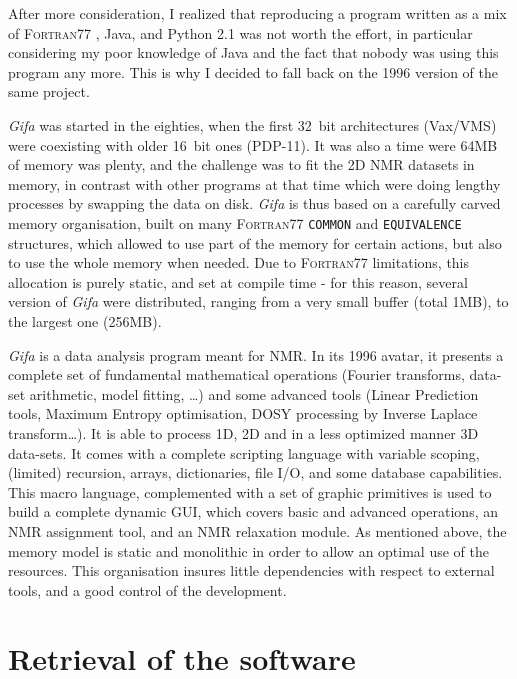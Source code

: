 After more consideration, I realized that reproducing a program written
as a mix of F\textsc{ortran}77 , Java, and Python 2.1 was not worth the
effort, in particular considering my poor knowledge of Java and the fact
that nobody was using this program any more. This is why I decided to
fall back on the 1996 version of the same project.

\emph{Gifa} was started in the eighties, when the first 32~bit
architectures (Vax/VMS) were coexisting with older 16~bit ones (PDP-11). It
was also a time were 64MB of memory was plenty, and the challenge was to
fit the 2D NMR datasets in memory, in contrast with other programs at
that time which were doing lengthy processes by swapping the data on
disk. \emph{Gifa} is thus based on a carefully carved memory
organisation, built on many F\textsc{ortran}77 \texttt{COMMON} and
\texttt{EQUIVALENCE} structures, which allowed to use part of the memory
for certain actions, but also to use the whole memory when needed. Due
to F\textsc{ortran}77 limitations, this allocation is purely static, and
set at compile time - for this reason, several version of \emph{Gifa}
were distributed, ranging from a very small buffer (total 1MB), to the
largest one (256MB).

\emph{Gifa} is a data analysis program meant for NMR. In its 1996
avatar, it presents a complete set of fundamental mathematical
operations (Fourier transforms, data-set arithmetic, model fitting,
\ldots{}) and some advanced tools (Linear Prediction tools, Maximum
Entropy optimisation, DOSY processing by Inverse Laplace
transform\ldots{}). It is able to process 1D, 2D and in a less optimized
manner 3D data-sets. It comes with a complete scripting language
with variable scoping, (limited) recursion, arrays, dictionaries, file I/O, and
some database capabilities. This macro language, complemented with a set
of graphic primitives is used to build a complete dynamic GUI, which
covers basic and advanced operations, an NMR assignment tool, and an NMR
relaxation module. As mentioned above, the memory model is static
and monolithic in order to allow an optimal use of the resources. This
organisation insures little dependencies with respect to external tools,
and a good control of the development.

\hypertarget{recovering-the-software}{%
\section{Retrieval of the software}\label{recovering-the-software}}

